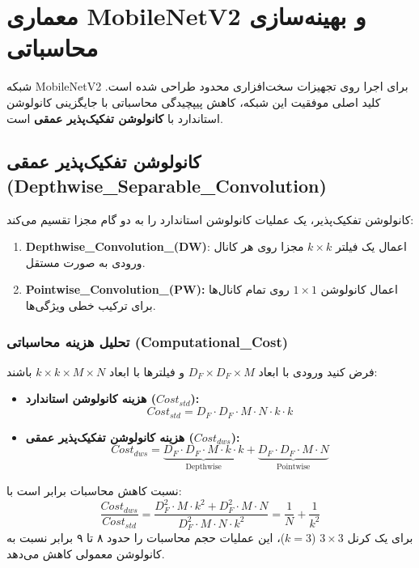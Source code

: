 \documentclass{report}
\begin{document}
 	\section{معماری MobileNetV2 و بهینه‌سازی محاسباتی}
 	شبکه MobileNetV2 برای اجرا روی تجهیزات سخت‌افزاری محدود طراحی شده است. کلید اصلی موفقیت این شبکه، کاهش پیپچیدگی محاسباتی با جایگزینی کانولوشن استاندارد با \textbf{کانولوشن تفکیک‌پذیر عمقی} است.
 	
 	\subsection{کانولوشن تفکیک‌پذیر عمقی (Depthwise\_Separable\_Convolution)}
 	کانولوشن تفکیک‌پذیر، یک عملیات کانولوشن استاندارد را به دو گام مجزا تقسیم می‌کند:
 	
 	\begin{enumerate}
 		\item \textbf{Depthwise\_Convolution\_(DW)}: اعمال یک فیلتر $k \times k$ مجزا روی هر کانال ورودی به صورت مستقل.
 		\item \textbf{Pointwise\_Convolution\_(PW):} اعمال کانولوشن $1 \times 1$ روی تمام کانال‌ها برای ترکیب خطی ویژگی‌ها.
 	\end{enumerate}
 	
 	\subsubsection{تحلیل هزینه محاسباتی (Computational\_Cost)}
 	فرض کنید ورودی با ابعاد $D_F \times D_F \times M$ و فیلترها با ابعاد $k \times k \times M \times N$ باشند:
 	
 	\begin{itemize}
 		\item \textbf{هزینه کانولوشن استاندارد ($Cost_{std}$):}
 		\begin{equation}
 			Cost_{std} = D_F \cdot D_F \cdot M \cdot N \cdot k \cdot k
 		\end{equation}
 		\item \textbf{هزینه کانولوشن تفکیک‌پذیر عمقی ($Cost_{dws}$):}
 		\begin{equation}
 			Cost_{dws} = \underbrace{D_F \cdot D_F \cdot M \cdot k \cdot k}_{\text{Depthwise}} + \underbrace{D_F \cdot D_F \cdot M \cdot N}_{\text{Pointwise}}
 		\end{equation}
 	\end{itemize}
 	
 	نسبت کاهش محاسبات برابر است با:
 	\begin{equation}
 		\frac{Cost_{dws}}{Cost_{std}} = \frac{D_F^2 \cdot M \cdot k^2 + D_F^2 \cdot M \cdot N}{D_F^2 \cdot M \cdot N \cdot k^2} = \frac{1}{N} + \frac{1}{k^2}
 	\end{equation}
 	برای یک کرنل $3 \times 3$ ($k=3$)، این عملیات حجم محاسبات را حدود ۸ تا ۹ برابر نسبت به کانولوشن معمولی کاهش می‌دهد.
 	
\end{document}
